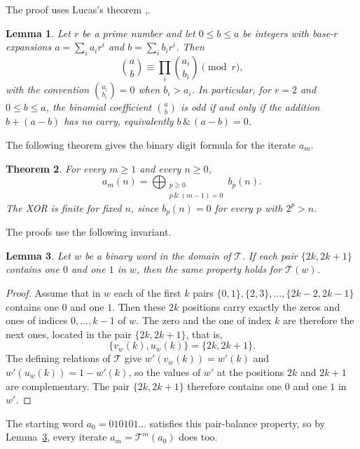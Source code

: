 \documentclass[12pt,reqno]{article}
\theoremstyle{plain}
\newtheorem{theorem}{Theorem}[section]
\newtheorem{lemma}[theorem]{Lemma}
\theoremstyle{definition}
\begin{document}
The proof uses Lucas's theorem \cite[p.~52]{Lucas1878},\cite{Granville1997}.

\begin{lemma}
\label{lem:lucas}
Let $r$ be a prime number and let $0 \le b \le a$ be integers with base-$r$ expansions $a = \sum_i a_i r^i$ and $b = \sum_i b_i r^i$. Then
\[
  \binom{a}{b} \equiv \prod_i \binom{a_i}{b_i} \pmod r,
\]
with the convention $\binom{a_i}{b_i} = 0$ when $b_i > a_i$. In particular, for $r = 2$ and $0 \le b \le a$, the binomial coefficient $\binom{a}{b}$ is odd if and only if the addition $b + (a-b)$ has no carry, equivalently $b \,\&\, (a-b) = 0$.
\end{lemma}

The following theorem gives the binary digit formula for the iterate $a_m$.

\begin{theorem}
\label{thm:masque-binaire}
For every $m \ge 1$ and every $n \ge 0$,
\[
  a_m(n) = \bigoplus_{\substack{p\ge0\\p\,\&\,(m-1)=0}} b_p(n).
\]
The XOR is finite for fixed $n$, since $b_p(n) = 0$ for every $p$ with $2^p > n$.
\end{theorem}

The proofs use the following invariant.

\begin{lemma}
\label{lem:pair-balance}
Let $w$ be a binary word in the domain of $\mathcal{T}$. If each pair $\{2k, 2k+1\}$ contains one $0$ and one $1$ in $w$, then the same property holds for $\mathcal{T}(w)$.
\end{lemma}

\begin{proof}
Assume that in $w$ each of the first $k$ pairs $\{0, 1\}, \{2, 3\}, \dots, \{2k-2, 2k-1\}$ contains one $0$ and one $1$. Then these $2k$ positions carry exactly the zeros and ones of indices $0, \dots, k-1$ of $w$. The zero and the one of index $k$ are therefore the next ones, located in the pair $\{2k, 2k+1\}$, that is,
\[
  \{v_w(k), u_w(k)\} = \{2k, 2k+1\}.
\]
The defining relations of $\mathcal{T}$ give $w'(v_w(k)) = w'(k)$ and $w'(u_w(k)) = 1 - w'(k)$, so the values of $w'$ at the positions $2k$ and $2k+1$ are complementary. The pair $\{2k, 2k+1\}$ therefore contains one $0$ and one $1$ in $w'$.
\end{proof}

The starting word $a_0 = 010101\dots$ satisfies this pair-balance property, so by Lemma~\ref{lem:pair-balance}, every iterate $a_m = \mathcal{T}^m(a_0)$ does too.
\end{document}
